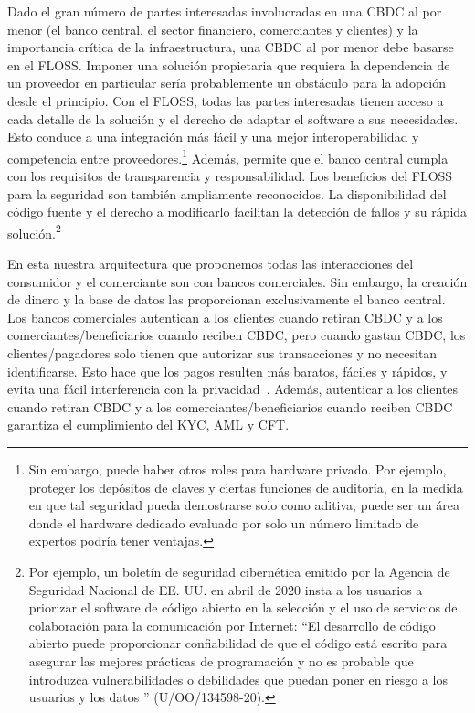 \documentclass[a4paper,10pt]{article} %
\begin{document}
Dado el gran número de partes interesadas involucradas en una CBDC al
por menor (el banco central, el sector financiero, comerciantes y
clientes) y la importancia crítica de la infraestructura, una CBDC al
por menor debe basarse en el FLOSS. Imponer una solución propietaria que
requiera la dependencia de un proveedor en particular sería
probablemente un obstáculo para la adopción desde el principio. Con el
FLOSS, todas las partes interesadas tienen acceso a cada detalle de la
solución y el derecho de adaptar el software a sus necesidades. Esto
conduce a una integración más fácil y una mejor interoperabilidad y
competencia entre proveedores.\footnote{Sin embargo, puede haber otros
roles para hardware privado. Por ejemplo, proteger los depósitos de
claves y ciertas funciones de auditoría, en la medida en que tal
seguridad pueda demostrarse solo como aditiva, puede ser un área donde
el hardware dedicado evaluado por solo un número limitado de expertos
podría tener ventajas.} Además, permite que el banco central cumpla
con los requisitos de transparencia y responsabilidad. Los beneficios
del FLOSS para la seguridad son también ampliamente reconocidos. La
disponibilidad del código fuente y el derecho a modificarlo facilitan la
detección de fallos y su rápida solución.\footnote{Por ejemplo, un
boletín de seguridad cibernética emitido por la Agencia de Seguridad
Nacional de EE. UU. en abril de 2020 insta a los usuarios a priorizar
el software de código abierto en la selección y el uso de servicios de
colaboración para la comunicación por Internet: ``El desarrollo de
código abierto puede proporcionar confiabilidad de que el código está
escrito para asegurar las mejores prácticas de programación y no es
probable que introduzca vulnerabilidades o debilidades que puedan
poner en riesgo a los usuarios y los datos '' (U/OO/134598-20).}

En esta nuestra arquitectura que proponemos todas las interacciones del
consumidor y el comerciante son con bancos comerciales. Sin embargo, la
creación de dinero y la base de datos las proporcionan exclusivamente el
banco central. Los bancos comerciales autentican a los clientes cuando
retiran CBDC y a los comerciantes/beneficiarios cuando reciben CBDC,
pero cuando gastan CBDC, los clientes/pagadores solo tienen que
autorizar sus transacciones y no necesitan identificarse. Esto hace que
los pagos resulten más baratos, fáciles y rápidos, y evita una fácil
interferencia con la privacidad~\cite{Dold}. Además, autenticar a los
clientes cuando retiran CBDC y a los comerciantes/beneficiarios cuando
reciben CBDC garantiza el cumplimiento del KYC, AML y CFT.
\end{document}
